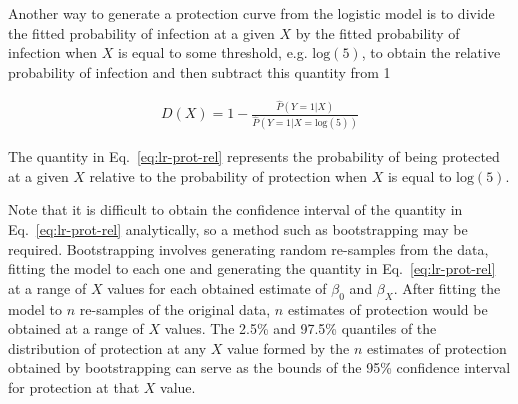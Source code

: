 Another way to generate a protection curve from the logistic model is to divide the fitted probability of infection at a given $X$ by the fitted probability of infection when $X$ is equal to some threshold, e.g. $\text{log}(5)$, to obtain the relative probability of infection and then subtract this quantity from 1

\begin{gather}
    D(X) = 1 - \frac{\hat{P}(Y=1 | X)}{\hat{P}(Y=1 | X = \text{log}(5))}
    \label{eq:lr-prot-rel}
\end{gather}

The quantity in Eq.~\ref{eq:lr-prot-rel} represents the probability of being protected at a given $X$ relative to the probability of protection when $X$ is equal to $\text{log}(5)$.

Note that it is difficult to obtain the confidence interval of the quantity in Eq.~\ref{eq:lr-prot-rel} analytically, so a method such as bootstrapping may be required.
Bootstrapping involves generating random re-samples from the data, fitting the model to each one and generating the quantity in Eq.~\ref{eq:lr-prot-rel} at a range of $X$ values for each obtained estimate of $\beta_0$ and $\beta_X$.
After fitting the model to $n$ re-samples of the original data, $n$ estimates of protection would be obtained at a range of $X$ values.
The 2.5\% and 97.5\% quantiles of the distribution of protection at any $X$ value formed by the $n$ estimates of protection obtained by bootstrapping can serve as the bounds of the 95\% confidence interval for protection at that $X$ value.
